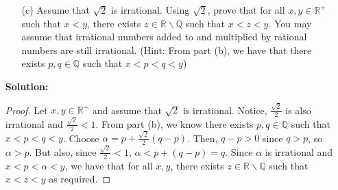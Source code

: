 \documentclass[letterpaper,12pt]{article}
\theoremstyle{definition}
\begin{document}
\pagebreak
\begin{enumerate}
    \item[] \begin{enumerate}
        \item[(c)] Assume that $\sqrt{2}$ is irrational. Using $\sqrt{2}$, prove that for all $x,y \in \mathbb{R}^+$ such that $x<y$, there exists $z \in \mathbb{R}\backslash \mathbb{Q}$ such that $x<z<y$. You may assume that irrational numbers added to and multiplied by rational numbers are still irrational. (Hint: From part (b), we have that there exists $p,q \in \mathbb{Q}$ such that $x<p<q<y$)
    \end{enumerate}
    \begin{mdframed}
            \textbf{Solution:}
            \begin{proof}
                Let $x,y \in \mathbb{R}^+$ and assume that $\sqrt{2}$ is irrational. Notice, $\frac{\sqrt{2}}{2}$ is also irrational and $\frac{\sqrt{2}}{2} < 1$. From part (b), we know there exists $p,q \in \mathbb{Q}$ such that $x<p<q<y$. Choose $\alpha = p + \frac{\sqrt{2}}{2}(q-p)$. Then, $q-p > 0$ since $q > p$, so $\alpha > p$. But also, since $\frac{\sqrt{2}}{2} < 1$, $\alpha < p + (q-p) = q $. Since $\alpha$ is irrational and $x < p < \alpha < y$, we have that for all $x,y$, there exists $z \in \mathbb{R} \backslash \mathbb{Q}$ such that $x < z < y$ as required.
            \end{proof}
        \end{mdframed}
\end{enumerate}
\pagebreak
\end{document}
